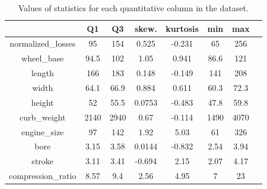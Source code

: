 \documentclass[11pt,a4paper]{article}\usepackage[]{graphicx}\usepackage[]{xcolor}
\begin{document}
			\begin{table}[ht]
			
			\centering
			
			\caption{Values of statistics  for each quantitative column in the dataset.} %
			\begin{tabular}{|c |c |c| c | c| c|c| c |} %
				
				\hline %
				 & Q1 & Q3 & skew. & kurtosis & min & max\\ [0.5ex] %
    \hline
    
    
				
        	normalized\_losses & 95   & 154  & 0.525& -0.231 & 65 & 256\\ \hline 
        	
	 	wheel\_base & 94.5    & 102  & 1.05& 0.941 & 86.6 & 121\\ \hline 
	 	
	 	 length & 166  & 183  & 0.148& -0.149 & 141 & 208\\ \hline 
	 	 	
	 	 	 	width & 64.1    & 66.9  & 0.884& 0.611 & 60.3 & 72.3\\ \hline 
	 	 	 	
	 	 	 	
	 	 	 	 	height & 52   & 55.5  & 0.0753& -0.483 & 47.8 & 59.8\\ \hline 
	 	 	 	 	
	 	 	 	 	
	 	 	 	 	 	curb\_weight & 2140   & 2940  & 0.67& -0.114 & 1490 & 4070\\ \hline 
	 	 	 	 	 	
	 	 	 	 	 	
	 	 	 	 	 	 	engine\_size & 97   & 142  & 1.92& 5.03 & 61 & 326\\ \hline 
	 	 	 	 	 	 	
	 	 	 	 	 	 	
	 	 	 	 	 	 	 	bore & 3.15    & 3.58  & 0.0144& -0.832 & 2.54 & 3.94\\ \hline 
	 	 	 	 	 	 	 	
	 	 	 	 	 	 	 	
	 	 	 	 	 	 	 	
	 	 	 	 	 	 	 	 stroke & 3.11   & 3.41  & -0.694& 2.15 & 2.07 & 4.17\\ \hline 
	 	 	 	 	 	 	 	 	
	 	 	 	 	 	 	 	 	
	 	 	 	 	 	 	 	 	
	 	 	 	 	 	 	 	 	 	compression\_ratio & 8.57   & 9.4  & 2.56& 4.95 & 7 & 23\\ \hline 
	 	 	 	 	 	 	 	 	 	

\end{tabular}
\end{table}
\end{document}
